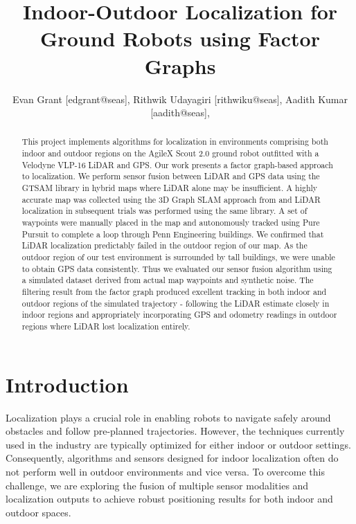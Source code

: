 \documentclass[10pt, reqno, letterpaper, twoside]{amsart}
\title{Indoor-Outdoor Localization for Ground Robots using Factor Graphs}
\author{
Evan Grant [edgrant@seas],
Rithwik Udayagiri [rithwiku@seas],
Aadith Kumar [aadith@seas],
}
\begin{document}
% 

\begin{abstract}

This project implements algorithms for localization in environments comprising both indoor and outdoor regions on the AgileX Scout 2.0 ground robot outfitted with a Velodyne VLP-16 LiDAR and GPS. Our work presents a factor graph-based approach to localization. We perform sensor fusion between LiDAR and GPS data using the GTSAM library \cite{Dellaert_gtsam2012} in hybrid maps where LiDAR alone may be insufficient. A highly accurate map was collected using the 3D Graph SLAM approach from \cite{hdl2019} and LiDAR localization in subsequent trials was performed using the same library. A set of waypoints were manually placed in the map and autonomously tracked using Pure Pursuit \cite{pure_pursuit_1992} to complete a loop through Penn Engineering buildings. We confirmed that LiDAR localization predictably failed in the outdoor region of our map. As the outdoor region of our test environment is surrounded by tall buildings, we were unable to obtain GPS data consistently. Thus we evaluated our sensor fusion algorithm using a simulated dataset derived from actual map waypoints and synthetic noise. The filtering result from the factor graph produced excellent tracking in both indoor and outdoor regions of the simulated trajectory - following the LiDAR estimate closely in indoor regions and appropriately incorporating GPS and odometry readings in outdoor regions where LiDAR lost localization entirely.

\end{abstract}

\maketitle

\section{Introduction}

Localization plays a crucial role in enabling robots to navigate safely around obstacles and follow pre-planned trajectories. However, the techniques currently used in the industry are typically optimized for either indoor or outdoor settings. Consequently, algorithms and sensors designed for indoor localization often do not perform well in outdoor environments and vice versa. To overcome this challenge, we are exploring the fusion of multiple sensor modalities and localization outputs to achieve robust positioning results for both indoor and outdoor spaces.
\end{document}
